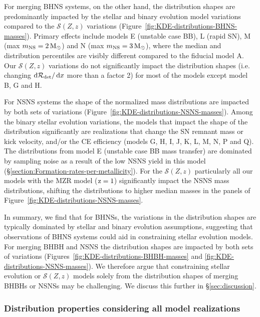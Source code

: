 \documentclass[fleqn,usenatbib]{mnras}
\newcommand{\Msun}{\ensuremath{\,\rm{M}_{\odot}}\xspace}
\newcommand{\SFRD}{\ensuremath{\mathcal{S}(Z,z)}\xspace}
\newcommand*\diff{\mathop{}\!\mathrm{d}}
\newcommand{\mnsf}{\ensuremath{m_{\rm{NS}}}\xspace}
\begin{document}
For merging \ac{BHNS} systems, on the other hand, the  distribution shapes are predominantly impacted by the stellar and binary evolution model variations compared to the \SFRD variations (Figure~\ref{fig:KDE-distributions-BHNS-masses}). Primary effects include models E (unstable case BB), L (rapid SN), M (max $\mnsf =2\Msun$) and N (max $\mnsf =3\Msun$), where the median and distribution percentiles are visibly  different compared to the fiducial model A. 
 Our \SFRD variations do not significantly impact the distribution shapes (i.e. changing $\diff \mathcal{R}_{\rm{det}} / \diff x$ more than a factor 2) for most of the models except model B, G and H.

For NSNS systems the shape of the normalized mass distributions are impacted by both sets of variations (Figure~\ref{fig:KDE-distributions-NSNS-masses}).  Among the binary stellar evolution variations, the models that impact the shape of the distribution significantly are realizations that change the SN remnant mass or kick velocity, and/or the CE efficiency (models G, H, I, J, K, L,  M, N, P and Q). The distributions from model E (unstable case BB mass transfer) are dominated by sampling noise as a result of the low NSNS yield in this model (\S\ref{section:Formation-rates-per-metallicity}). For the \SFRD particularly all our models with the  \citet{2006ApJ...638L..63L} \ac{MZR} model ($\rm{z}=1$) significantly impact the \ac{NSNS} mass distributions, shifting the distributions to higher median masses in the panels of Figure~\ref{fig:KDE-distributions-NSNS-masses}.  




In summary, we find that for \acp{BHNS}, the variations in the distribution shapes are typically dominated by stellar and binary evolution assumptions, suggesting that observations of \ac{BHNS} systems could aid in constraining stellar evolution models.  For merging \ac{BHBH} and \ac{NSNS} the distribution shapes are impacted by both sets of variations (Figures~\ref{fig:KDE-distributions-BHBH-masses} and \ref{fig:KDE-distributions-NSNS-masses}). We therefore argue that constraining stellar evolution or \SFRD models solely from the distribution shapes of merging BHBHs or NSNSs may be challenging. We discuss this further in \S\ref{sec:discussion}. 


\subsubsection{Distribution properties considering all model realizations}
\label{sec:results-distributions-BH-mass}
\end{document}
